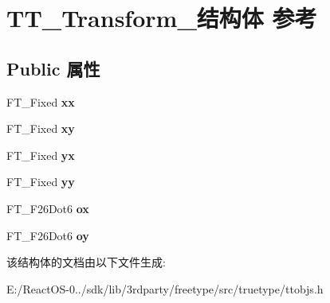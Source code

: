 \hypertarget{struct_t_t___transform__}{}\section{T\+T\+\_\+\+Transform\+\_\+结构体 参考}
\label{struct_t_t___transform__}
\subsection*{Public 属性}
\begin{DoxyCompactItemize}
\item 
\mbox{\label{struct_t_t___transform___acd051b7cee4f5a2531282165b06d897f}} 
F\+T\+\_\+\+Fixed {\bfseries xx}
\item 
\mbox{\label{struct_t_t___transform___af191563f12e0b182ead6196482baffba}} 
F\+T\+\_\+\+Fixed {\bfseries xy}
\item 
\mbox{\label{struct_t_t___transform___a42cfea1fc4a943c74efe02aeea4595db}} 
F\+T\+\_\+\+Fixed {\bfseries yx}
\item 
\mbox{\label{struct_t_t___transform___a1b80f8e814134f57c32ef25b64c01de4}} 
F\+T\+\_\+\+Fixed {\bfseries yy}
\item 
\mbox{\label{struct_t_t___transform___a957fe3a8db4c502773d70cfddad7461f}} 
F\+T\+\_\+\+F26\+Dot6 {\bfseries ox}
\item 
\mbox{\label{struct_t_t___transform___a0d0b9015f9252104602e9b7510d948bf}} 
F\+T\+\_\+\+F26\+Dot6 {\bfseries oy}
\end{DoxyCompactItemize}


该结构体的文档由以下文件生成\+:\begin{DoxyCompactItemize}
\item 
E\+:/\+React\+O\+S-\/0../sdk/lib/3rdparty/freetype/src/truetype/ttobjs.\+h\end{DoxyCompactItemize}
